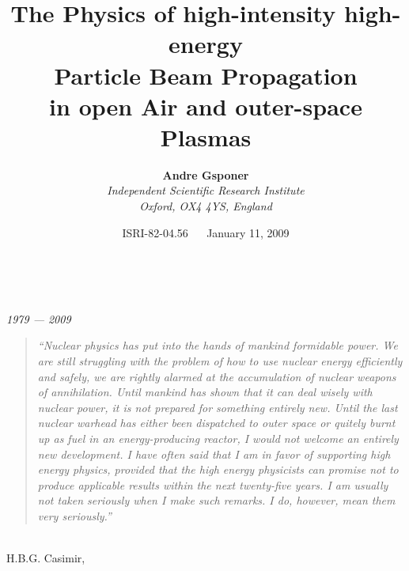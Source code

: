 \documentclass [12pt,a4paper,     ]{report} %
\begin{document}
\title{\bf The Physics of high-intensity high-energy\\
                   Particle Beam Propagation\\
              in open Air and outer-space Plasmas}


\author{
         {\bf Andre Gsponer}\\
         {\it Independent Scientific Research Institute}\\ 
         {\it Oxford, OX4 4YS, England}
       }

\date{ISRI-82-04.56 ~~  January 11, 2009} 

\maketitle

\newpage


%


~\\ \vspace{4\baselineskip}

\begin{center}{\Large {\it 1979 --- 2009}} \end{center}

\vspace{1\baselineskip}

\begin{quote} 
\emph{``Nuclear physics has put into the hands of mankind formidable power. We are still struggling with the problem of how to use nuclear energy efficiently and safely, we are rightly alarmed at the accumulation of nuclear weapons of annihilation.  Until mankind has shown that it can deal wisely with nuclear power, it is not prepared for something entirely new.  Until the last nuclear warhead has either been dispatched to outer space or quitely burnt up as fuel in an energy-producing reactor, I would not welcome an entirely new development.  I have often said that I am in favor of supporting high energy physics, provided that the high energy physicists can promise not to produce applicable results within the next twenty-five years.  I am usually not taken seriously when I make such remarks.  I do, however, mean them very seriously.''}
\end{quote}

~\\

\hspace{6.5cm} H.B.G. Casimir,
\end{document}
